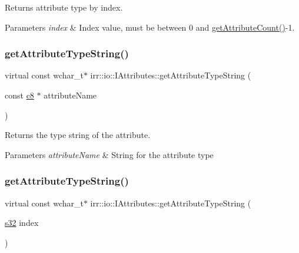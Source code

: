 Returns attribute type by index. 


\begin{DoxyParams}{Parameters}
{\em index} & Index value, must be between 0 and \hyperlink{classirr_1_1io_1_1IAttributes_a796bdd9440ee7ba0b6742a90a82870b6}{get\+Attribute\+Count()}-\/1. \\
\hline
\end{DoxyParams}
\mbox{\label{classirr_1_1io_1_1IAttributes_a6a460acccdbf5b2f8eac8d2bd6a1e428}} 
\subsubsection{\texorpdfstring{get\+Attribute\+Type\+String()}{getAttributeTypeString()}\hspace{0.1cm}{\footnotesize\ttfamily [1/2]}}
{\footnotesize\ttfamily virtual const wchar\+\_\+t$\ast$ irr\+::io\+::\+I\+Attributes\+::get\+Attribute\+Type\+String (\begin{DoxyParamCaption}\item[{const \hyperlink{namespaceirr_a9395eaea339bcb546b319e9c96bf7410}{c8} $\ast$}]{attribute\+Name }\end{DoxyParamCaption})\hspace{0.3cm}{\ttfamily [pure virtual]}}



Returns the type string of the attribute. 


\begin{DoxyParams}{Parameters}
{\em attribute\+Name} & String for the attribute type \\
\hline
\end{DoxyParams}
\mbox{\label{classirr_1_1io_1_1IAttributes_a2dc2dffe38bc50222615f40a7ca7711a}} 
\subsubsection{\texorpdfstring{get\+Attribute\+Type\+String()}{getAttributeTypeString()}\hspace{0.1cm}{\footnotesize\ttfamily [2/2]}}
{\footnotesize\ttfamily virtual const wchar\+\_\+t$\ast$ irr\+::io\+::\+I\+Attributes\+::get\+Attribute\+Type\+String (\begin{DoxyParamCaption}\item[{\hyperlink{namespaceirr_ac66849b7a6ed16e30ebede579f9b47c6}{s32}}]{index }\end{DoxyParamCaption})\hspace{0.3cm}{\ttfamily [pure virtual]}}



